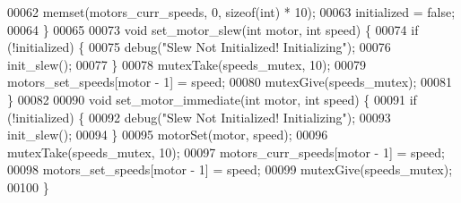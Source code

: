 \begin{DoxyCode}
00062   memset(motors_curr_speeds, 0, \textcolor{keyword}{sizeof}(\textcolor{keywordtype}{int}) * 10);
00063   initialized = \textcolor{keyword}{false};
00064 \}
00065 
00073 \textcolor{keywordtype}{void} set_motor_slew(\textcolor{keywordtype}{int} motor, \textcolor{keywordtype}{int} speed) \{
00074   \textcolor{keywordflow}{if} (!initialized) \{
00075     debug(\textcolor{stringliteral}{"Slew Not Initialized! Initializing"});
00076     init_slew();
00077   \}
00078   mutexTake(speeds_mutex, 10);
00079   motors_set_speeds[motor - 1] = speed;
00080   mutexGive(speeds_mutex);
00081 \}
00082 
00090 \textcolor{keywordtype}{void} set_motor_immediate(\textcolor{keywordtype}{int} motor, \textcolor{keywordtype}{int} speed) \{
00091   \textcolor{keywordflow}{if} (!initialized) \{
00092     debug(\textcolor{stringliteral}{"Slew Not Initialized! Initializing"});
00093     init_slew();
00094   \}
00095   motorSet(motor, speed);
00096   mutexTake(speeds_mutex, 10);
00097   motors_curr_speeds[motor - 1] = speed;
00098   motors_set_speeds[motor - 1] = speed;
00099   mutexGive(speeds_mutex);
00100 \}
\end{DoxyCode}
